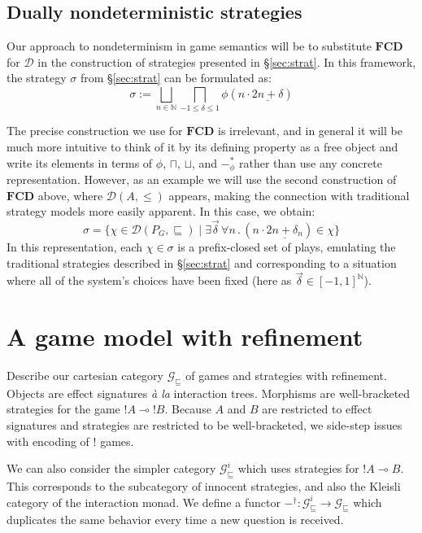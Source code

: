 \documentclass[format=sigplan,authordraft]{acmart}
\newcommand{\gcat}{\mathcal{G}_{\sqsubseteq}}
\begin{document}

\subsection{Dually nondeterministic strategies} %

Our approach to nondeterminism in game semantics
will be to substitute $\mathbf{FCD}$ for $\mathcal{D}$
in the construction of strategies presented in \S\ref{sec:strat}.
In this framework,
the strategy $\sigma$ from \S\ref{sec:strat}
can be formulated as:
\[
  \sigma :=
    \bigsqcup_{n \in \mathbb{N}}
    \bigsqcap_{-1 \le \delta \le 1}
    \phi(n \cdot \underline{2n + \delta})
\]

The precise construction we use for $\mathbf{FCD}$ is irrelevant,
and in general it will be much more intuitive
to think of it by its defining property as a free object and
write its elements in terms of $\phi$, $\sqcap$, $\sqcup$, and $-_\phi^*$
rather than use any concrete representation.
However, as an example
we will use the second construction of $\mathbf{FCD}$ above,
where $\mathcal{D}(A, {\le})$ appears,
making the connection with traditional strategy models
more easily apparent.
In this case, we obtain:
\[
    \sigma =
    \{ \chi \in \mathcal{D}(P_G, {\sqsubseteq}) \mid
       \exists \vec{\delta} \,
       \forall n \,.\,
       (n \cdot \underline{2n + \delta_n}) \in \chi \}
\]
In this representation,
each $\chi \in \sigma$
is a prefix-closed set of plays,
emulating the traditional strategies described in \S\ref{sec:strat}
and corresponding to a situation where all of the system's choices
have been fixed (here as $\vec{\delta} \in [-1,1]^\mathbb{N}$).




\section{A game model with refinement} %

Describe our cartesian category $\gcat$
of games and strategies with refinement.
Objects are effect signatures \emph{\`a la} interaction trees.
Morphisms are well-bracketed strategies for
the game ${!A} \multimap {!B}$.
Because $A$ and $B$ are restricted to effect signatures and
strategies are restricted to be well-bracketed,
we side-step issues with encoding of $!$ games.

We can also consider the simpler category
$\gcat^i$
which uses strategies for ${!A} \multimap B$.
This corresponds to the subcategory of innocent strategies,
and also the Kleisli category of the interaction monad.
We define a functor
$-^\dagger : \gcat^i \rightarrow \gcat$
which duplicates the same behavior
every time a new question is received.
\end{document}
